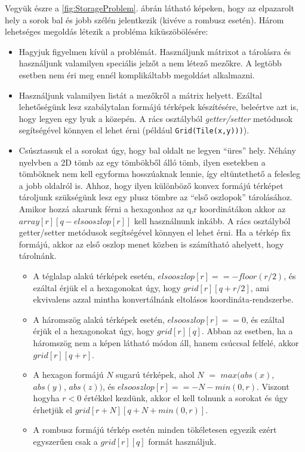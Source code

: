 \noindent Vegyük észre a \ref{fig:StorageProblem}. ábrán látható képeken, hogy az elpazarolt hely a sorok bal és jobb szélén jelentkezik (kivéve a rombusz esetén). Három lehetséges megoldás létezik a probléma kiküszöbölésére:
\begin{itemize}
\item Hagyjuk figyelmen kívül a problémát. Használjunk mátrixot a tárolásra és használjunk valamilyen speciális jelzőt a nem létező mezőkre. A legtöbb esetben nem éri meg ennél komplikáltabb megoldást alkalmazni.
\item Használjunk valamilyen listát a mezőkről a mátrix helyett. Ezáltal lehetőségünk lesz szabálytalan formájú térképek készítésére, beleértve azt is, hogy legyen egy lyuk a közepén. A rács osztályból \textit{getter/setter} metódusok segítségével könnyen el lehet érni (például \texttt{Grid(Tile(x,y)))}).
\item Csúsztassuk el a sorokat úgy, hogy bal oldalt ne legyen “üres” hely. Néhány nyelvben a 2D tömb az egy tömbökből álló tömb, ilyen esetekben a tömböknek nem kell egyforma hosszúaknak lennie, így eltüntethető a felesleg a jobb oldalról is. Ahhoz, hogy ilyen különböző konvex formájú térképet tároljunk szükségünk lesz egy plusz tömbre az “első oszlopok” tárolásához. Amikor hozzá akarunk férni a hexagonhoz az q,r koordinátákon akkor az $array[r][q - elsooszlop[r]]$ kell használnunk inkább. A rács osztályból getter/setter metódusok segítségével könnyen el lehet érni.
\newline
\newline Ha a térkép fix formájú, akkor az első oszlop menet közben is számítható ahelyett, hogy tárolnánk.
\begin{itemize}
\item A téglalap alakú térképek esetén, $elsooszlop[r] == -floor(r/2)$, és ezáltal érjük el a hexagonokat úgy, hogy $grid[r][q + r/2]$, ami ekvivalens azzal mintha konvertálnánk eltolásos koordináta-rendszerbe.
\item A háromszög alakú térképek esetén, $elsooszlop[r] == 0$, és ezáltal érjük el a hexagonokat úgy, hogy $grid[r][q]$. Abban az esetben, ha a háromszög nem a képen látható módon áll, hanem csúccsal felfelé, akkor $grid[r][q + r]$.
\item A hexagon formájú $N$ sugarú térképek, ahol $N$ $=$ $max(abs(x)$, $abs(y)$, $abs(z))$, és $elsooszlop[r] == -N - min(0, r)$. Viszont hogyha $r < 0$ értékkel kezdünk, akkor el kell tolnunk a sorokat és úgy érhetjük el $grid[r + N][q + N + min(0, r)]$.
\item A rombusz formájú térkép esetén minden tökéletesen egyezik ezért egyszerűen csak a $grid[r][q]$ formát használjuk.
\end{itemize}
\end{itemize}

